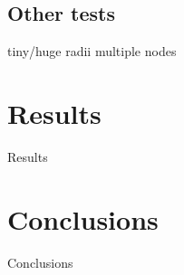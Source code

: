 \documentclass{beamer}
\begin{document}
\subsection{Other tests}
tiny/huge radii
multiple nodes



\section{Results}

\begin{frame}	
	\begin{Huge}
		\begin{center}
			Results
		\end{center}
	\end{Huge}
\end{frame}


\section{Conclusions}

\begin{frame}	
	\begin{Huge}
		\begin{center}
			Conclusions
		\end{center}
	\end{Huge}
\end{frame}




\end{document}
